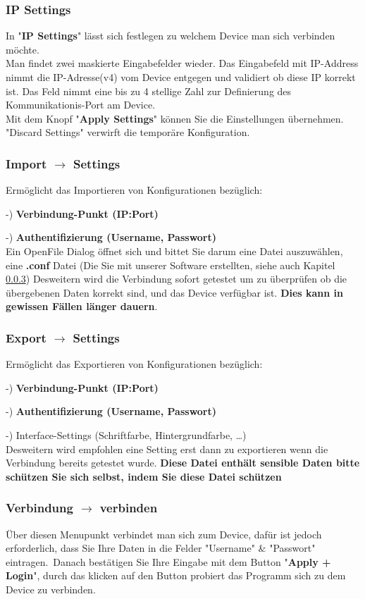 \documentclass[11pt]{article} %
\begin{document}
\subsubsection{IP Settings}
In "\textbf{IP Settings}" lässt sich festlegen zu welchem Device man sich verbinden möchte.\\
Man findet zwei maskierte Eingabefelder wieder. Das Eingabefeld mit IP-Address nimmt die IP-Adresse(v4) vom Device entgegen und validiert ob diese IP korrekt ist. Das Feld nimmt eine bis zu 4 stellige Zahl zur Definierung des Kommunikationis-Port am Device.\\
Mit dem Knopf "\textbf{Apply Settings}" können Sie die Einstellungen übernehmen. "Discard Settings" verwirft die temporäre Konfiguration.\\
\subsubsection{Import $\rightarrow$ Settings}
Ermöglicht das Importieren von Konfigurationen bezüglich: 

-) \textbf{Verbindung-Punkt (IP:Port)}

-) \textbf{Authentifizierung (Username, Passwort)}\\
Ein OpenFile Dialog öffnet sich und bittet Sie darum eine Datei auszuwählen, eine \textbf{.conf} Datei (Die Sie mit unserer Software erstellten, siehe auch Kapitel \ref{sec:FFES})
Desweitern wird die Verbindung sofort getestet um zu überprüfen ob die übergebenen Daten korrekt sind, und das Device verfügbar ist.
\textbf{Dies kann in gewissen Fällen länger dauern}.\\
\subsubsection{Export $\rightarrow$ Settings}
\label{sec:FFES}
Ermöglicht das Exportieren von Konfigurationen bezüglich: 

-) \textbf{Verbindung-Punkt (IP:Port)}

-) \textbf{Authentifizierung (Username, Passwort)}

-) Interface-Settings (Schriftfarbe, Hintergrundfarbe, \dots )\\
Desweitern wird empfohlen eine Setting erst dann zu exportieren wenn die Verbindung bereits getestet wurde.
\textbf{Diese Datei enthält sensible Daten bitte schützen Sie sich selbst, indem Sie diese Datei schützen}\\
\subsubsection{Verbindung $\rightarrow$ verbinden}
Über diesen Menupunkt verbindet man sich zum Device, dafür ist jedoch erforderlich, dass Sie Ihre Daten in die Felder "Username" \& "Passwort" eintragen.\
Danach bestätigen Sie Ihre Eingabe mit dem Button "\textbf{Apply + Login}", durch das klicken auf den Button probiert das Programm sich zu dem Device zu verbinden.\\
\end{document}
